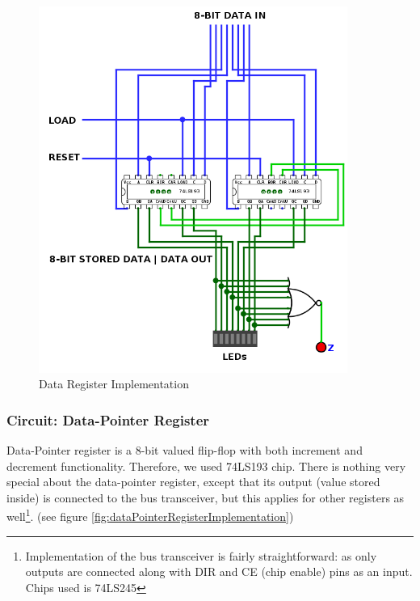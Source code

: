 \begin{figure}[H]
	\centering
	\includegraphics[width=0.9\textwidth]{img/data_register_implementation}
	\caption{Data Register Implementation}
	\label{fig:dataRegisterImplementation}
\end{figure}


\subsubsection{Circuit: Data-Pointer Register}
Data-Pointer register is a 8-bit valued flip-flop with both increment and decrement functionality. Therefore, we used 74LS193 chip. There is nothing very special about the data-pointer register, except that its output (value stored inside) is connected to the bus transceiver, but this applies for other registers as well\footnote{Implementation of the bus transceiver is fairly straightforward: as only outputs are connected along with DIR and CE (chip enable) pins as an input. Chips used is 74LS245}. (see figure \ref{fig:dataPointerRegisterImplementation})

